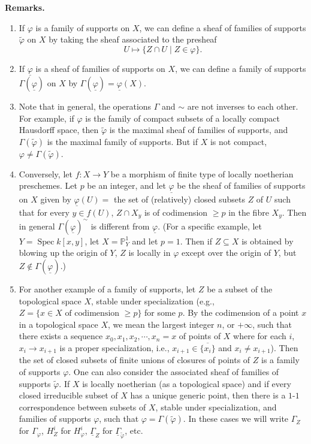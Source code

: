 \par\medskip\noindent\textbf{Remarks.}
\begin{enumerate}
\item If $\varphi$ is a family of supports on $X$, we can define a sheaf of families of supports $\widetilde{\varphi}$ on $X$ by taking the sheaf associated to the presheaf
\[
U\longmapsto \{Z\cap U\mid Z\in\varphi\}.
\]
\item If $\underline{\varphi}$ is a sheaf of families of supports on $X$, we can define a family of supports $\Gamma(\underline{\varphi})$ on $X$ by $\Gamma(\underline{\varphi})=\underline{\varphi}(X)$.
\item Note that in general, the operations $\Gamma$ and $\sim$ are not inverses to each other. For example, if $\varphi$ is the family of compact subsets of a locally compact Hausdorff space, then $\widetilde{\varphi}$ is the maximal sheaf of families of supports, and $\Gamma(\widetilde{\varphi})$ is the maximal family of supports. But if $X$ is not compact, $\varphi\neq\Gamma(\widetilde{\varphi})$.
\item Conversely, let $f\colon X\to Y$ be a morphism of finite type of locally noetherian preschemes. Let $p$ be an integer, and let $\underline{\varphi}$ be the sheaf of families of supports on $X$ given by $\underline{\varphi}(U)=$ the set of (relatively) closed subsets $Z$ of $U$ such that for every $y\in f(U)$, $Z\cap X_y$ is of codimension $\geq p$ in the fibre $X_y$. Then in general $\Gamma(\underline{\varphi})^{\sim}$ is different from $\underline{\varphi}$. (For a specific example, let $Y=\operatorname{Spec}k[x,y]$, let $X=\mathbb{P}^1_Y$ and let $p=1$. Then if $Z\subseteq X$ is obtained by blowing up the origin of $Y$, $Z$ is locally in $\varphi$ except over the origin of $Y$, but $Z\notin \Gamma(\underline{\varphi})$.)
\item For another example of a family of supports, let $Z$ be a subset of the topological space $X$, stable under specialization (e.g., $Z=\{x\in X\text{ of codimension }\geq p\}$ for some $p$. By the codimension of a point $x$ in a topological space $X$, we mean the largest integer $n$, or $+\infty$, such that there exists a sequence $x_0,x_1,x_2,\cdots,x_n=x$ of points of $X$ where for each $i$, $x_i\to x_{i+1}$ is a proper specialization, i.e., $x_{i+1}\in\overline{\{x_i\}}$ and $x_i\neq x_{i+1}$). Then the set of closed subsets of finite unions of closures of points of $Z$ is a family of supports $\varphi$. One can also consider the associated sheaf of families of supports $\widetilde{\varphi}$. If $X$ is locally noetherian (as a topological space) and if every closed irreducible subset of $X$ has a unique generic point, then there is a $1$-$1$ correspondence between subsets of $X$, stable under specialization, and families of supports $\varphi$, such that $\varphi=\Gamma(\widetilde{\varphi})$. In these cases we will write $\Gamma_Z$ for $\Gamma_{\varphi}$, $H_Z^i$ for $H_{\varphi}^i$, $\underline{\Gamma}_Z$ for $\underline{\Gamma}_{\widetilde{\varphi}}$, etc.
\end{enumerate}
\par\medskip

